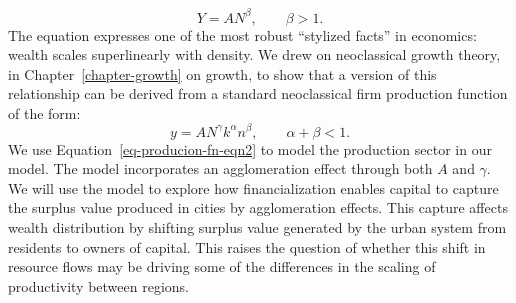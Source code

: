 \begin{equation}\label{eq-agglom-eqn2}
    Y=AN^\beta,\qquad \beta>1. 
\end{equation}
The equation expresses one of the most robust ``stylized facts'' in economics: wealth scales superlinearly with density.  We drew on neoclassical growth theory, in Chapter~\ref{chapter-growth} on growth, to show that a version of this relationship can be derived from a standard neoclassical firm production function of the form: 
\begin{equation}\label{eq-producion-fn-eqn2}
    y=AN^\gamma k^\alpha n^\beta,\qquad \alpha+\beta<1. 
\end{equation}
We use Equation~\ref{eq-producion-fn-eqn2} to model the production sector in our model. The model incorporates an agglomeration effect through both $A$ and $\gamma$. We will use the model to explore how financialization enables capital to capture the surplus value produced in cities by agglomeration effects. This capture affects wealth distribution by shifting surplus value generated by the urban system from residents to owners of capital. %
This raises the question of whether this shift in resource flows may be driving some of the differences in the scaling of productivity between regions.


